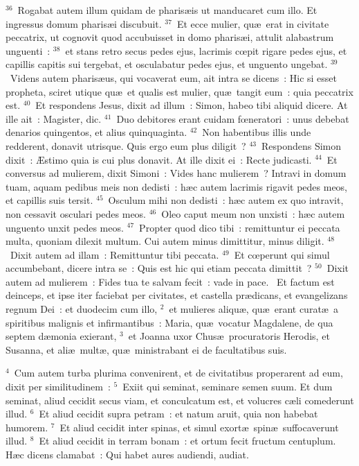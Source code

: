 ${}^{36}$~Rogabat autem illum quidam de pharis\ae is ut manducaret cum illo. Et ingressus domum pharis\ae i discubuit.
${}^{37}$~Et ecce mulier, qu\ae\ erat in civitate peccatrix, ut cognovit quod accubuisset in domo pharis\ae i, attulit alabastrum unguenti~:
${}^{38}$~et stans retro secus pedes ejus, lacrimis cœpit rigare pedes ejus, et capillis capitis sui tergebat, et osculabatur pedes ejus, et unguento ungebat.
${}^{39}$~Videns autem pharis\ae us, qui vocaverat eum, ait intra se dicens~: Hic si esset propheta, sciret utique qu\ae\ et qualis est mulier, qu\ae\ tangit eum~: quia peccatrix est.
${}^{40}$~Et respondens Jesus, dixit ad illum~: Simon, habeo tibi aliquid dicere. At ille ait~: Magister, dic.
${}^{41}$~Duo debitores erant cuidam fœneratori~: unus debebat denarios quingentos, et alius quinquaginta.
${}^{42}$~Non habentibus illis unde redderent, donavit utrisque. Quis ergo eum plus diligit~?
${}^{43}$~Respondens Simon dixit~: \AE stimo quia is cui plus donavit. At ille dixit ei~: Recte judicasti.
${}^{44}$~Et conversus ad mulierem, dixit Simoni~: Vides hanc mulierem~? Intravi in domum tuam, aquam pedibus meis non dedisti~: h\ae c autem lacrimis rigavit pedes meos, et capillis suis tersit.
${}^{45}$~Osculum mihi non dedisti~: h\ae c autem ex quo intravit, non cessavit osculari pedes meos.
${}^{46}$~Oleo caput meum non unxisti~: h\ae c autem unguento unxit pedes meos.
${}^{47}$~Propter quod dico tibi~: remittuntur ei peccata multa, quoniam dilexit multum. Cui autem minus dimittitur, minus diligit.
${}^{48}$~Dixit autem ad illam~: Remittuntur tibi peccata.
${}^{49}$~Et cœperunt qui simul accumbebant, dicere intra se~: Quis est hic qui etiam peccata dimittit~?
${}^{50}$~Dixit autem ad mulierem~: Fides tua te salvam fecit~: vade in pace.
~Et factum est deinceps, et ipse iter faciebat per civitates, et castella pr\ae dicans, et evangelizans regnum Dei~: et duodecim cum illo,
${}^{2}$~et mulieres aliqu\ae , qu\ae\ erant curat\ae\ a spiritibus malignis et infirmantibus~: Maria, qu\ae\ vocatur Magdalene, de qua septem d\ae monia exierant,
${}^{3}$~et Joanna uxor Chus\ae\ procuratoris Herodis, et Susanna, et ali\ae\ mult\ae , qu\ae\ ministrabant ei de facultatibus suis.


${}^{4}$~Cum autem turba plurima convenirent, et de civitatibus properarent ad eum, dixit per similitudinem~:
${}^{5}$~Exiit qui seminat, seminare semen suum. Et dum seminat, aliud cecidit secus viam, et conculcatum est, et volucres c\ae li comederunt illud.
${}^{6}$~Et aliud cecidit supra petram~: et natum aruit, quia non habebat humorem.
${}^{7}$~Et aliud cecidit inter spinas, et simul exort\ae\ spin\ae\ suffocaverunt illud.
${}^{8}$~Et aliud cecidit in terram bonam~: et ortum fecit fructum centuplum. H\ae c dicens clamabat~: Qui habet aures audiendi, audiat.


